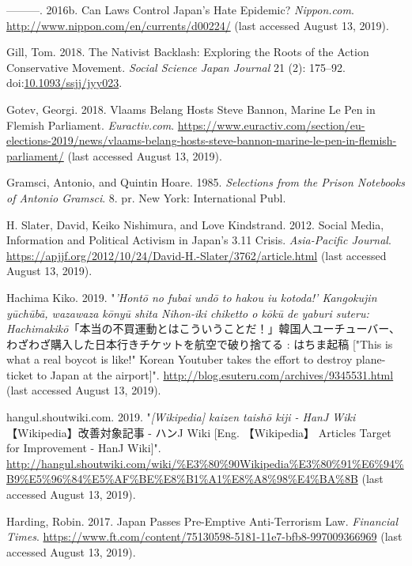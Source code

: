 \documentclass[10pt,british,A4paper,oneside]{memoir}
\begin{document}
\hypertarget{ref-furuya_can_2016}{}
---------. 2016b. Can Laws Control Japan's Hate Epidemic?
\emph{Nippon.com}. \url{http://www.nippon.com/en/currents/d00224/} (last accessed August 13, 2019).

\hypertarget{ref-gill_nativist_2018}{}
Gill, Tom. 2018. The Nativist Backlash: Exploring the Roots of the
Action Conservative Movement. \emph{Social Science Japan Journal} 21
(2): 175--92.
doi:\href{https://doi.org/10.1093/ssjj/jyy023}{10.1093/ssjj/jyy023}.

\hypertarget{ref-gotev_vlaams_2018}{}
Gotev, Georgi. 2018. Vlaams Belang Hosts Steve Bannon, Marine Le Pen in
Flemish Parliament. \emph{Euractiv.com}.
\url{https://www.euractiv.com/section/eu-elections-2019/news/vlaams-belang-hosts-steve-bannon-marine-le-pen-in-flemish-parliament/} (last accessed August 13, 2019).

\hypertarget{ref-gramsci_selections_1985}{}
Gramsci, Antonio, and Quintin Hoare. 1985. \emph{Selections from the
Prison Notebooks of Antonio Gramsci}. 8. pr. New York: International
Publ.

\hypertarget{ref-h._slater_social_2012}{}
H. Slater, David, Keiko Nishimura, and Love Kindstrand. 2012. Social
Media, Information and Political Activism in Japan's 3.11 Crisis.
\emph{Asia-Pacific Journal}.
\url{https://apjjf.org/2012/10/24/David-H.-Slater/3762/article.html} (last accessed August 13, 2019).

\hypertarget{ref-hachima_kiko_eng:_2019}{}
Hachima Kiko. 2019. "\emph{'Hontō no fubai undō to hakou iu kotoda!' Kangokujin yūchūbā, wazawaza kōnyū shita Nihon-iki chiketto o kōkū de yaburi suteru: Hachimakikō}「本当の不買運動とはこういうことだ！」韓国人ユーチューバー、わざわざ購入した日本行きチケットを航空で破り捨てる : はちま起稿 ["This is what a real boycot is like!" Korean Youtuber takes the effort to destroy plane-ticket to Japan at the airport]". \url{http://blog.esuteru.com/archives/9345531.html} (last accessed August 13, 2019).

\hypertarget{ref-hangul.shoutwiki.com_wikipedia_2019}{}
hangul.shoutwiki.com. 2019. "\emph{[Wikipedia] kaizen taishō kiji - HanJ Wiki} 【Wikipedia】改善対象記事 - ハンJ Wiki [Eng. 【Wikipedia】 Articles Target for Improvement - HanJ Wiki]".
\url{http://hangul.shoutwiki.com/wiki/\%E3\%80\%90Wikipedia\%E3\%80\%91\%E6\%94\%B9\%E5\%96\%84\%E5\%AF\%BE\%E8\%B1\%A1\%E8\%A8\%98\%E4\%BA\%8B} (last accessed August 13, 2019).

\hypertarget{ref-harding_japan_2017}{}
Harding, Robin. 2017. Japan Passes Pre-Emptive Anti-Terrorism Law.
\emph{Financial Times}.
\url{https://www.ft.com/content/75130598-5181-11e7-bfb8-997009366969} (last accessed August 13, 2019).
\end{document}
